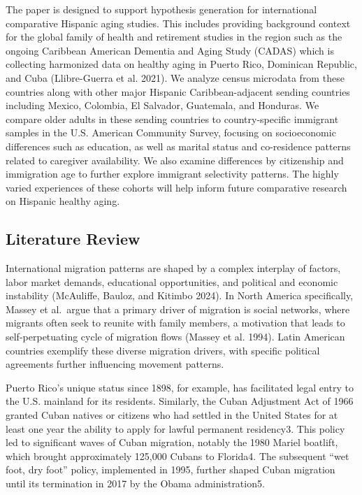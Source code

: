 \documentclass[
]{article}
\begin{document}
The paper is designed to support hypothesis generation for international
comparative Hispanic aging studies. This includes providing background
context for the global family of health and retirement studies in the
region such as the ongoing Caribbean American Dementia and Aging Study
(CADAS) which is collecting harmonized data on healthy aging in Puerto
Rico, Dominican Republic, and Cuba (Llibre-Guerra et al. 2021). We
analyze census microdata from these countries along with other major
Hispanic Caribbean-adjacent sending countries including Mexico,
Colombia, El Salvador, Guatemala, and Honduras. We compare older adults
in these sending countries to country-specific immigrant samples in the
U.S. American Community Survey, focusing on socioeconomic differences
such as education, as well as marital status and co-residence patterns
related to caregiver availability. We also examine differences by
citizenship and immigration age to further explore immigrant selectivity
patterns. The highly varied experiences of these cohorts will help
inform future comparative research on Hispanic healthy aging.

\subsection{Literature Review}\label{sec-lit}

International migration patterns are shaped by a complex interplay of
factors, labor market demands, educational opportunities, and political
and economic instability (McAuliffe, Bauloz, and Kitimbo 2024). In North
America specifically, Massey et al.~argue that a primary driver of
migration is social networks, where migrants often seek to reunite with
family members, a motivation that leads to self-perpetuating cycle of
migration flows (Massey et al. 1994). Latin American countries exemplify
these diverse migration drivers, with specific political agreements
further influencing movement patterns.

Puerto Rico's unique status since 1898, for example, has facilitated
legal entry to the U.S. mainland for its residents. Similarly, the Cuban
Adjustment Act of 1966 granted Cuban natives or citizens who had settled
in the United States for at least one year the ability to apply for
lawful permanent residency3. This policy led to significant waves of
Cuban migration, notably the 1980 Mariel boatlift, which brought
approximately 125,000 Cubans to Florida4. The subsequent ``wet foot, dry
foot'' policy, implemented in 1995, further shaped Cuban migration until
its termination in 2017 by the Obama administration5.
\end{document}
